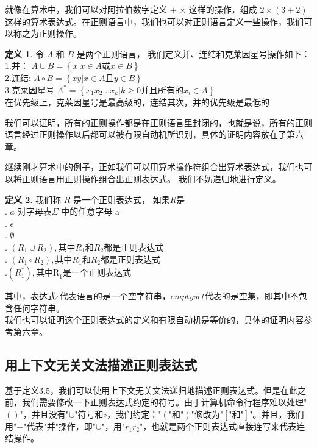 \documentclass[openany,oneside]{book}
\theoremstyle{definition}
\newtheorem{definition}{\hspace{2em}定义}[chapter]
\begin{document}
	就像在算术中，我们可以对阿拉伯数字定义 \(+\) \(\times\) 这样的操作，组成 \( 2 \times \left( 3 +2\right) \)这样的算术表达式。在正则语言中，我们也可以对正则语言定义一些操作，我们可以称之为正则操作。
	\begin{definition}
		令 \(A\) 和 \(B\) 是两个正则语言， 我们定义并、连结和克莱因星号操作如下：\\
		\indent \indent 1.并： \(A \cup B = \left\lbrace x|x \in A \mbox{或} x \in B \right\rbrace \)\\
		\indent \indent 2.连结: \(A \circ B = \left\lbrace xy| x \in A \mbox{且} y\in B \right\rbrace\)\\
		\indent \indent 3.克莱因星号 \(A^* = \left\lbrace x_1 x_2 ...x_k | k \ge 0 \mbox{并且所有的} x_i \in  A \right\rbrace\)\\
		\indent \indent 在优先级上，克莱因星号是最高级的，连结其次，并的优先级是最低的
	\end{definition}
	我们可以证明，所有的正则操作都是在正则语言里封闭的，也就是说，所有的正则语言经过正则操作以后都可以被有限自动机所识别，具体的证明内容放在了第六章。
	
	继续刚才算术中的例子，正如我们可以用算术操作符组合出算术表达式，我们也可以将正则语言用正则操作组合出正则表达式。
	我们不妨递归地进行定义。
	\begin{definition}
		我们称 \(R\) 是一个正则表达式， 如果\(R\)是 \\
		\indent {}. \(a\) 对字母表\(\Sigma\) 中的任意字母 a\\
		\indent {}. \(\epsilon\)\\
		\indent {}. $\emptyset$\\
		\indent {}. \(\left(  R_1 \cup R_2 \right) ,\mbox{其中}R_1\mbox{和}R_2 \mbox{都是正则表达式}  \)\\
		\indent {}. \( \left( R_1 \circ R_2 \right),\mbox{其中}R_1\mbox{和}R_2\mbox{都是正则表达式}\)\\
		\indent {}.\(\left( R_1^* \right) , \mbox{其中R}_1\mbox{是一个正则表达式}\)\\
		\indent 
	\end{definition}
	其中，表达式\(\epsilon\)代表语言的是一个空字符串，\(emptyset\)代表的是空集，即其中不包含任何字符串。\\
	\indent 我们也可以证明这个正则表达式的定义和有限自动机是等价的，具体的证明内容参考第六章。
	
\subsection{用上下文无关文法描述正则表达式}
	基于定义3.5，我们可以使用上下文无关文法递归地描述正则表达式。但是在此之前，我们需要修改一下正则表达式约定的符号。由于计算机命令行程序难以处理"\(\left(\right)\)"，并且没有"\(\cup\)"符号和\(\circ\)，我们约定：\(\mbox{"}\left(\mbox{"和"}\right)\mbox{"}\)修改为\(\mbox{"}\left[  \mbox{"和"}\right]\mbox{"}\)。并且，我们用"\(+\)"代表"并"操作，即"\(\cup\)"，用"\(r_1 r_2\)"，也就是两个正则表达式直接连写来代表连结操作。
	
\end{document}
